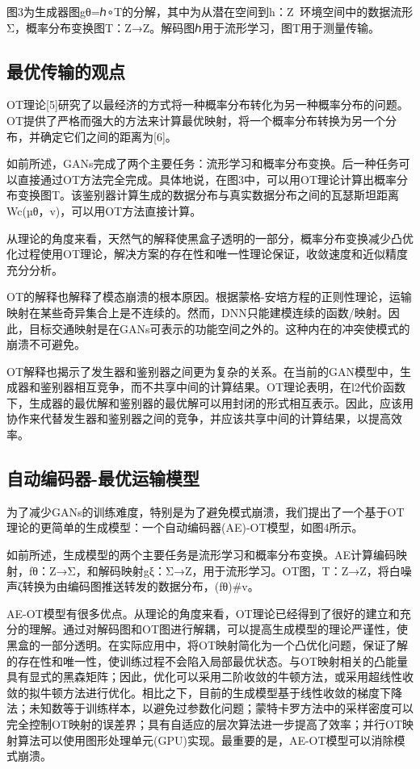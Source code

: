 图3为生成器图gθ=ℎ∘T的分解，其中为从潜在空间到h：Z环境空间中的数据流形Σ，概率分布变换图T：Z→Z。解码图ℎ用于流形学习，图T用于测量传输。

\subsection{最优传输的观点}

OT理论[5]研究了以最经济的方式将一种概率分布转化为另一种概率分布的问题。OT提供了严格而强大的方法来计算最优映射，将一个概率分布转换为另一个分布，并确定它们之间的距离为[6]。

如前所述，GANs完成了两个主要任务：流形学习和概率分布变换。后一种任务可以直接通过OT方法完全完成。具体地说，在图3中，可以用OT理论计算出概率分布变换图T。该鉴别器计算生成的数据分布与真实数据分布之间的瓦瑟斯坦距离Wc(µθ，v)，可以用OT方法直接计算。

从理论的角度来看，天然气的解释使黑盒子透明的一部分，概率分布变换减少凸优化过程使用OT理论，解决方案的存在性和唯一性理论保证，收敛速度和近似精度充分分析。

OT的解释也解释了模态崩溃的根本原因。根据蒙格-安培方程的正则性理论，运输映射在某些奇异集合上是不连续的。然而，DNN只能建模连续的函数/映射。因此，目标交通映射是在GANs可表示的功能空间之外的。这种内在的冲突使模式的崩溃不可避免。

OT解释也揭示了发生器和鉴别器之间更为复杂的关系。在当前的GAN模型中，生成器和鉴别器相互竞争，而不共享中间的计算结果。OT理论表明，在l2代价函数下，生成器的最优解和鉴别器的最优解可以用封闭的形式相互表示。因此，应该用协作来代替发生器和鉴别器之间的竞争，并应该共享中间的计算结果，以提高效率。

\subsection{自动编码器-最优运输模型}

为了减少GANs的训练难度，特别是为了避免模式崩溃，我们提出了一个基于OT理论的更简单的生成模型：一个自动编码器(AE)-OT模型，如图4所示。

如前所述，生成模型的两个主要任务是流形学习和概率分布变换。AE计算编码映射，fθ：Z→Σ，和解码映射gξ：Σ→Z，用于流形学习。OT图，T：Z→Z，将白噪声ζ转换为由编码图推送转发的数据分布，(fθ)\#v。

AE-OT模型有很多优点。从理论的角度来看，OT理论已经得到了很好的建立和充分的理解。通过对解码图和OT图进行解耦，可以提高生成模型的理论严谨性，使黑盒的一部分透明。在实际应用中，将OT映射简化为一个凸优化问题，保证了解的存在性和唯一性，使训练过程不会陷入局部最优状态。与OT映射相关的凸能量具有显式的黑森矩阵；因此，优化可以采用二阶收敛的牛顿方法，或采用超线性收敛的拟牛顿方法进行优化。相比之下，目前的生成模型基于线性收敛的梯度下降法；未知数等于训练样本，以避免过参数化问题；蒙特卡罗方法中的采样密度可以完全控制OT映射的误差界；具有自适应的层次算法进一步提高了效率；并行OT映射算法可以使用图形处理单元(GPU)实现。最重要的是，AE-OT模型可以消除模式崩溃。

